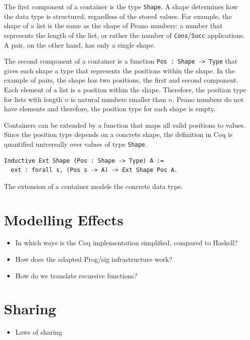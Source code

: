 \documentclass[a4paper, 11pt, fleqn, twoside]{scrreprt}
\newcommand{\hinl}[1]{\texttt{#1}}
\begin{document}
The first component of a container is the type \texttt{Shape}. A 
shape determines how the data type is structured, regardless of the stored 
values. For example, the  shape of a list is the same as the shape of Peano 
numbers: a number that  represents the length of the list, or rather the number 
of \hinl{Cons}/\hinl{Succ} applications. A pair, 
on the other hand, has only a single shape.

The second component of a container is a function \texttt{Pos : Shape 
-> Type} that gives each shape a type that represents the positions within the 
shape. In the example of pairs, the shape has two positions, the first and 
second component. Each element of a list is a position within the shape. 
Therefore, the position type for lists with length $n$ is natural numbers 
smaller than $n$. Peano numbers do not have elements and therefore, the 
position type for each shape is empty.

Containers can be extended by a function that maps all valid positions to 
values. Since the position type depends on a concrete shape, the definition in 
Coq is quantified universally over values of type \texttt{Shape}.

\begin{verbatim}
Inductive Ext Shape (Pos : Shape -> Type) A := 
  ext : forall s, (Pos s -> A) -> Ext Shape Pos A.
\end{verbatim}

The extension of a container models the concrete data type.

\section{Modelling Effects}
\begin{itemize}
\item In which ways is the Coq implementation simplified, compared to Haskell?
\item How does the adapted Prog/sig infrastructure work?
\item How do we translate recursive functions?
\end{itemize}

\section{Sharing}
\label{sec:lawsOfSharing}
\begin{itemize}
\item Laws of sharing
\end{itemize}
\end{document}
